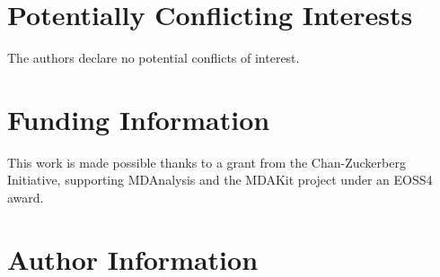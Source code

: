 \documentclass[9pt,whitepaper]{livecoms}
\newcommand{\githubrepository}{\url{https://github.com/MDAnalysis/MDAKits}}
\begin{document}

%



\section*{Potentially Conflicting Interests}

The authors declare no potential conflicts of interest.

\section*{Funding Information}

This work is made possible thanks to a grant from the Chan-Zuckerberg Initiative, supporting MDAnalysis and the MDAKit project under an EOSS4 award.


\section*{Author Information}
\makeorcid




\end{document}
